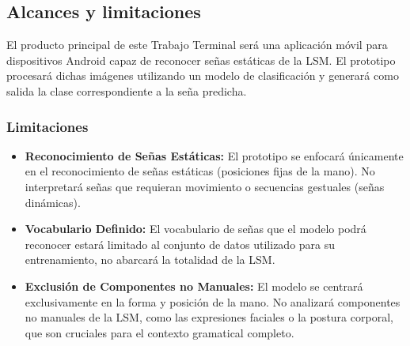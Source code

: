 	\subsection{Alcances y limitaciones}
	
	El producto principal de este Trabajo Terminal será una aplicación móvil para dispositivos Android capaz de reconocer señas estáticas de la LSM. El prototipo procesará dichas imágenes utilizando un modelo de clasificación y generará como salida la clase correspondiente a la seña predicha. 
	
	\subsubsection{Limitaciones}
	
	\begin{itemize}
		\item \textbf{Reconocimiento de Señas Estáticas:} El prototipo se enfocará únicamente en el reconocimiento de señas estáticas (posiciones fijas de la mano). No interpretará señas que requieran movimiento o secuencias gestuales (señas dinámicas). 
		
		\item \textbf{Vocabulario Definido:} El vocabulario de señas que el modelo podrá reconocer estará limitado al conjunto de datos utilizado para su entrenamiento, no abarcará la totalidad de la 
		LSM. 
		
		\item \textbf{Exclusión de Componentes no Manuales:} El modelo se centrará exclusivamente en la forma y posición de la mano. No analizará componentes no manuales de la LSM, como las expresiones faciales o la postura corporal, que son cruciales para el contexto gramatical completo. 
		
	\end{itemize}
	
	\newpage


